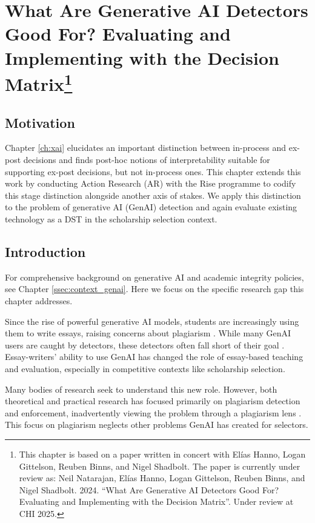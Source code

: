 \chapter[What Are Generative AI Detectors Good For?]{\label{ch:genai}What Are Generative AI Detectors Good For? Evaluating and Implementing with the Decision Matrix\footnote{This chapter is based on a paper written in concert with Elías Hanno, Logan Gittelson, Reuben Binns, and Nigel Shadbolt. The paper is currently under review as: Neil Natarajan, Elías Hanno, Logan Gittelson, Reuben Binns, and Nigel Shadbolt. 2024. ``What Are Generative AI Detectors Good For? Evaluating and Implementing with the Decision Matrix''. Under review at CHI 2025.}}

\minitoc

\section{Motivation}
Chapter \ref{ch:xai} elucidates an important distinction between in-process and ex-post decisions and finds post-hoc notions of interpretability suitable for supporting ex-post decisions, but not in-process ones. This chapter extends this work by conducting Action Research (AR) with the Rise programme to codify this stage distinction alongside another axis of stakes. We apply this distinction to the problem of generative AI (GenAI) detection and again evaluate existing technology as a DST in the scholarship selection context.

\section{Introduction}\label{sec:genaiintro}
For comprehensive background on generative AI and academic integrity policies, see Chapter \ref{ssec:context_genai}. Here we focus on the specific research gap this chapter addresses.

Since the rise of powerful generative AI models, students are increasingly using them to write essays, raising concerns about plagiarism \cite{dehouche_plagiarism_2021}. While many GenAI users are caught by detectors, these detectors often fall short of their goal \cite{liang_gpt_2023,kalpesh_krishna_paraphrasing_2023,mitchell_detectgpt_2023,tharindu_kumarage_stylometric_2023,dehouche_plagiarism_2021}. Essay-writers' ability to use GenAI has changed the role of essay-based teaching and evaluation, especially in competitive contexts like scholarship selection.

Many bodies of research seek to understand this new role. However, both theoretical and practical research has focused primarily on plagiarism detection and enforcement, inadvertently viewing the problem through a plagiarism lens \cite{mitchell_detectgpt_2023,liang_gpt_2023}. This focus on plagiarism neglects other problems GenAI has created for selectors.

